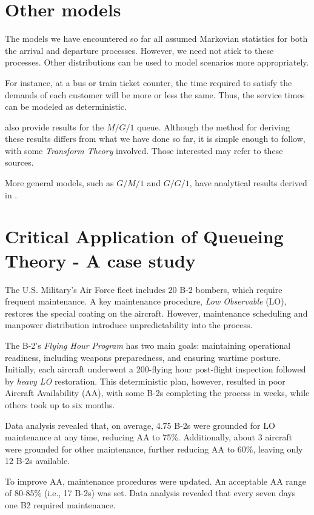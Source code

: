\documentclass[11pt, a4paper]{report}
\begin{document}
\section{Other models}
The models we have encountered so far all assumed Markovian statistics for both the arrival and departure processes. However, we need not stick to these processes. Other distributions can be used to model scenarios more appropriately.

For instance, at a bus or train ticket counter, the time required to satisfy the demands of each customer will be more or less the same. Thus, the service times can be modeled as deterministic.

\cite{RobertazziQ,myReference} also provide results for the $M/G/1$ queue. Although the method for deriving these results differs from what we have done so far, it is simple enough to follow, with some \emph{Transform Theory} involved. Those interested may refer to these sources.

More general models, such as $G/M/1$ and $G/G/1$, have analytical results derived in \cite{10.1214/aoms/1177728975,kleinrock1974queueing}.

\section{Critical Application of Queueing Theory - A case study\cite{key}}
The U.S. Military’s Air Force fleet includes 20 B-2 bombers, which require frequent maintenance. A key maintenance procedure, \emph{Low Observable} (LO), restores the special coating on the aircraft. However, maintenance scheduling and manpower distribution introduce unpredictability into the process.

The B-2's \emph{Flying Hour Program} has two main goals: maintaining operational readiness, including weapons preparedness, and ensuring wartime posture. Initially, each aircraft underwent a 200-flying hour post-flight inspection followed by \emph{heavy LO} restoration. This deterministic plan, however, resulted in poor Aircraft Availability (AA), with some B-2s completing the process in weeks, while others took up to six months.

Data analysis revealed that, on average, 4.75 B-2s were grounded for LO maintenance at any time, reducing AA to 75\%. Additionally, about 3 aircraft were grounded for other maintenance, further reducing AA to 60\%, leaving only 12 B-2s available.

To improve AA, maintenance procedures were updated. An acceptable AA range of 80-85\% (i.e., 17 B-2s) was set. Data analysis revealed that every seven days one B2 required maintenance.
\end{document}
